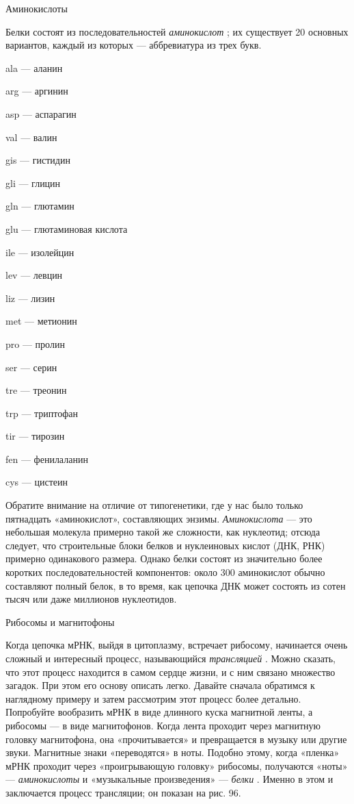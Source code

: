 \documentclass[../main.tex]{subfiles}
\begin{document}
Аминокислоты

Белки состоят из последовательностей \emph{аминокислот} ; их существует 20 основных вариантов, каждый из которых --- аббревиатура из трех букв.

ala --- аланин

arg --- аргинин

asp --- аспарагин

val --- валин

gis --- гистидин

gli --- глицин

gln --- глютамин

glu --- глютаминовая кислота

ile --- изолейцин

lev --- левцин

liz --- лизин

met --- метионин

pro --- пролин

ser --- серин

tre --- треонин

trp --- триптофан

tir --- тирозин

fen --- фенилаланин

cys --- цистеин

Обратите внимание на отличие от типогенетики, где у нас было только пятнадцать «аминокислот», составляющих энзимы. \emph{Аминокислота} --- это небольшая молекула примерно такой же сложности, как нуклеотид; отсюда следует, что строительные блоки белков и нуклеиновых кислот (ДНК, РНК) примерно одинакового размера. Однако белки состоят из значительно более коротких последовательностей компонентов: около 300 аминокислот обычно составляют полный белок, в то время, как цепочка ДНК может состоять из сотен тысяч или даже миллионов нуклеотидов.

Рибосомы и магнитофоны

Когда цепочка мРНК, выйдя в цитоплазму, встречает рибосому, начинается очень сложный и интересный процесс, называющийся \emph{трансляцией} . Можно сказать, что этот процесс находится в самом сердце жизни, и с ним связано множество загадок. При этом его основу описать легко. Давайте сначала обратимся к наглядному примеру и затем рассмотрим этот процесс более детально. Попробуйте вообразить мРНК в виде длинного куска магнитной ленты, а рибосомы --- в виде магнитофонов. Когда лента проходит через магнитную головку магнитофона, она «прочитывается» и превращается в музыку или другие звуки. Магнитные знаки «переводятся» в ноты. Подобно этому, когда «пленка» мРНК проходит через «проигрывающую головку» рибосомы, получаются «ноты» --- \emph{аминокислоты} и «музыкальные произведения» --- \emph{белки} . Именно в этом и заключается процесс трансляции; он показан на рис. 96.
\end{document}
